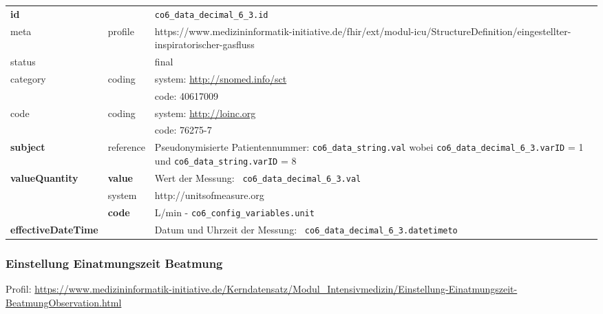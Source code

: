 \begin{longtable}{|l|l|p{7.5cm}|}
	\hline
	\rowcolor{lightgray} \multicolumn{3}{|l|}{Data Mapping (inhaltlich)} \\ \hline
	\textbf{id} &  & \texttt{co6\_data\_decimal\_6\_3.id} \\ \hline
	meta & profile & https://www.medizininformatik-initiative.de/fhir/ext/modul-icu/StructureDefinition/eingestellter-inspiratorischer-gasfluss \\ \hline 
	status &  & final   \\ \hline 
	category & coding & system: \url{http://snomed.info/sct} \\
	\cline{3-3}
	& & code: 40617009 \\ \hline
	code & coding & system: \url{http://loinc.org} \\ 
	\cline{3-3} 
	&  & code: 76275-7 \\ \hline
	\textbf{subject} & reference & Pseudonymisierte Patientennummer: \texttt{co6\_data\_string.val} wobei \texttt{co6\_data\_decimal\_6\_3.varID} = 1 und \texttt{co6\_data\_string.varID} = 8 \\ \hline
	\textbf{valueQuantity}  & \textbf{value} & Wert der Messung: \texttt{
		co6\_data\_decimal\_6\_3.val} \\
	\cline{2-3}
	& system & http://unitsofmeasure.org \\
	\cline{2-3}
	& \textbf{code} &
	L/min - \texttt{co6\_config\_variables.unit}
	\\ \hline
	\textbf{effectiveDateTime}  & & Datum und Uhrzeit der Messung: \texttt{
		co6\_data\_decimal\_6\_3.datetimeto} \\ \hline
\end{longtable}

\subsubsection{Einstellung Einatmungszeit Beatmung}

Profil: \url{https://www.medizininformatik-initiative.de/Kerndatensatz/Modul_Intensivmedizin/Einstellung-Einatmungszeit-BeatmungObservation.html}

